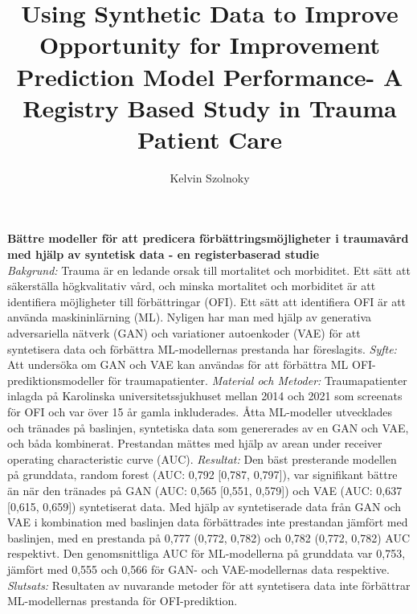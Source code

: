 \documentclass[12pt, a4paper]{article}
\author{Kelvin Szolnoky}
\title{Using Synthetic Data to Improve Opportunity for Improvement Prediction Model Performance- A Registry Based Study in Trauma Patient Care}
\begin{document}
\begin{titlepage}
	
\end{titlepage}
\fontsize{11}{13}\selectfont


\textbf{Bättre modeller för att predicera förbättringsmöjligheter i traumavård med hjälp av syntetisk data - en registerbaserad studie} \\
\textit{Bakgrund:} Trauma är en ledande orsak till mortalitet och morbiditet. Ett sätt att säkerställa
högkvalitativ vård, och minska mortalitet och morbiditet är att identifiera möjligheter till förbättringar (OFI).
Ett sätt att identifiera OFI är att använda maskininlärning (ML). Nyligen har man med hjälp av generativa
adversariella nätverk (GAN) och variationer autoenkoder (VAE) för att syntetisera data och förbättra ML-modellernas
prestanda har föreslagits. \textit{Syfte:} Att undersöka om GAN och VAE kan användas för att förbättra ML
OFI-prediktionsmodeller för traumapatienter. \textit{Material och Metoder:} Traumapatienter inlagda på Karolinska
universitetssjukhuset mellan 2014 och 2021 som screenats för OFI och var över 15 år gamla inkluderades. Åtta
ML-modeller utvecklades och tränades på baslinjen, syntetiska data som genererades av en GAN och VAE, och båda kombinerat.
Prestandan mättes med hjälp av arean under receiver operating characteristic curve (AUC). \textit{Resultat:}
Den bäst presterande modellen på grunddata, random forest (AUC: 0,792 [0,787, 0,797]), var signifikant bättre än när den
tränades på GAN (AUC: 0,565 [0,551, 0,579]) och VAE (AUC: 0,637 [0,615, 0,659]) syntetiserat
data. Med hjälp av syntetiserade data från GAN och VAE i kombination med baslinjen data förbättrades inte
prestandan jämfört med baslinjen, med en prestanda på 0,777 (0,772, 0,782) och 0,782 (0,772, 0,782) AUC respektivt.
Den genomsnittliga AUC för ML-modellerna på grunddata var 0,753, jämfört med 0,555 och 0,566 för GAN- och VAE-modellernas data respektive.
\textit{Slutsats:} Resultaten av nuvarande metoder för att syntetisera data inte förbättrar ML-modellernas prestanda
för OFI-prediktion.
\vfill
\end{document}
